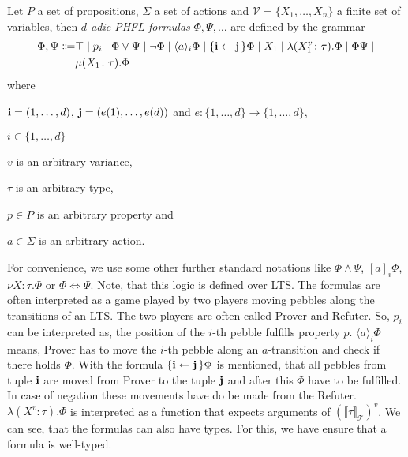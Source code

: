 \begin{definition}
    Let $P$ a set of propositions, $\Sigma$ a set of actions and $\mathcal{V} = \{X_1, \dots, X_n\}$ a finite set
    of variables, then
    \emph{$d$-adic PHFL formulas} $\Phi, \Psi,\dots$ are defined by the grammar
    \begin{align*}
        \Phi,\Psi\Coloneqq&\top \mid p_i \mid \Phi \vee \Psi \mid \neg \Phi \mid \langle a \rangle_i \Phi \mid
        \{\emph{i}
        \leftarrow \emph{j}\,\} \Phi \mid X_1 \mid \lambda (X_1^v\colon\tau).\Phi \mid \Phi \Psi\mid  \\
        &\mu (X_1\colon\tau).\Phi
    \end{align*}
    where
    \begin{compactitem}
        \item $\emph{i} = (1,\dots, d)$, $\emph{j} = (e(1), \dots, e(d))$ and $e: \{1, \dots, d\} \rightarrow
        \{1, \dots, d\}$,
        \item $i \in \{1, \dots, d\}$
        \item $v$ is an arbitrary variance,
        \item $\tau$ is an arbitrary type,
        \item $p \in P$ is an arbitrary property and
        \item $a \in \Sigma$ is an arbitrary action.
    \end{compactitem}
\end{definition}

For convenience, we use some other further standard notations like $\Phi \wedge \Psi$, $[a]_i\Phi$, $\nu
X \colon \tau.\Phi$ or $\Phi \Leftrightarrow \Psi$. Note, that this logic is defined over LTS. The formulas are
often interpreted as a game played by two players moving pebbles along the transitions of an LTS. The two players
are often called Prover and Refuter. So, $p_i$ can be interpreted as, the position of the $i$-th pebble fulfills
property $p$. $\langle a \rangle_i \Phi$ means, Prover has to move the $i$-th pebble along an $a$-transition and
check if there holds $\Phi$. With the formula $\{\emph{i}\leftarrow\emph{j}\,\} \Phi$ is mentioned, that all pebbles
from tuple $\emph{i}$ are moved from Prover to the tuple $\emph{j}$ and after this $\Phi$ have to be fulfilled. In
case of negation these movements have do be made from the Refuter. $\lambda (X^v\colon\tau).\Phi$ is interpreted as a
function that expects arguments of $(\llbracket\tau\rrbracket_\mathcal{T})^v$. We can see, that the formulas can also
have types. For this, we have ensure that a formula is well-typed.

